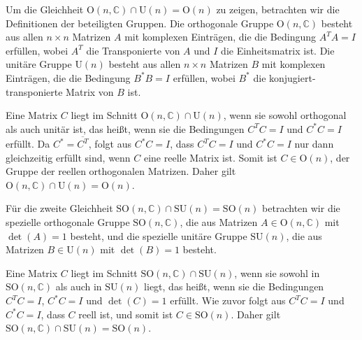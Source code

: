 Um die Gleichheit $\mathrm{O}(n, \mathbb{C}) \cap \mathrm{U}(n) = \mathrm{O}(n)$ zu zeigen, betrachten wir die Definitionen der beteiligten Gruppen. Die orthogonale Gruppe $\mathrm{O}(n, \mathbb{C})$ besteht aus allen $n \times n$ Matrizen $A$ mit komplexen Einträgen, die die Bedingung $A^T A = I$ erfüllen, wobei $A^T$ die Transponierte von $A$ und $I$ die Einheitsmatrix ist. Die unitäre Gruppe $\mathrm{U}(n)$ besteht aus allen $n \times n$ Matrizen $B$ mit komplexen Einträgen, die die Bedingung $B^* B = I$ erfüllen, wobei $B^*$ die konjugiert-transponierte Matrix von $B$ ist.

Eine Matrix $C$ liegt im Schnitt $\mathrm{O}(n, \mathbb{C}) \cap \mathrm{U}(n)$, wenn sie sowohl orthogonal als auch unitär ist, das heißt, wenn sie die Bedingungen $C^T C = I$ und $C^* C = I$ erfüllt. Da $C^* = \overline{C^T}$, folgt aus $C^* C = I$, dass $C^T C = I$ und $C^* C = I$ nur dann gleichzeitig erfüllt sind, wenn $C$ eine reelle Matrix ist. Somit ist $C \in \mathrm{O}(n)$, der Gruppe der reellen orthogonalen Matrizen. Daher gilt $\mathrm{O}(n, \mathbb{C}) \cap \mathrm{U}(n) = \mathrm{O}(n)$.

Für die zweite Gleichheit $\mathrm{SO}(n, \mathbb{C}) \cap \mathrm{SU}(n) = \mathrm{SO}(n)$ betrachten wir die spezielle orthogonale Gruppe $\mathrm{SO}(n, \mathbb{C})$, die aus Matrizen $A \in \mathrm{O}(n, \mathbb{C})$ mit $\det(A) = 1$ besteht, und die spezielle unitäre Gruppe $\mathrm{SU}(n)$, die aus Matrizen $B \in \mathrm{U}(n)$ mit $\det(B) = 1$ besteht.

Eine Matrix $C$ liegt im Schnitt $\mathrm{SO}(n, \mathbb{C}) \cap \mathrm{SU}(n)$, wenn sie sowohl in $\mathrm{SO}(n, \mathbb{C})$ als auch in $\mathrm{SU}(n)$ liegt, das heißt, wenn sie die Bedingungen $C^T C = I$, $C^* C = I$ und $\det(C) = 1$ erfüllt. Wie zuvor folgt aus $C^T C = I$ und $C^* C = I$, dass $C$ reell ist, und somit ist $C \in \mathrm{SO}(n)$. Daher gilt $\mathrm{SO}(n, \mathbb{C}) \cap \mathrm{SU}(n) = \mathrm{SO}(n)$.